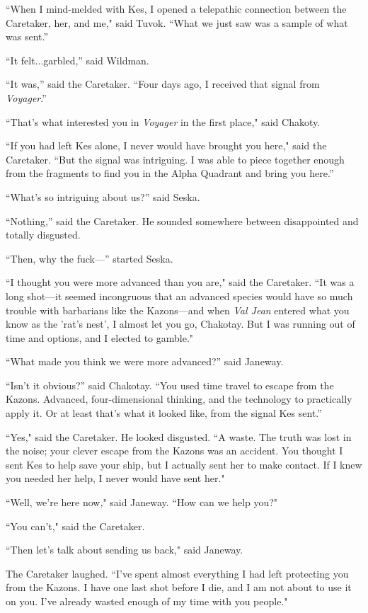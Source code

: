 \documentclass[twoside,letterpaper,12pt]{memoir}
\begin{document}
``When I mind-melded with Kes, I opened a telepathic connection between the Caretaker, her, and me," said Tuvok. ``What we just saw was a sample of what was sent.” 

``It felt...garbled,” said Wildman. 

``It was,” said the Caretaker. ``Four days ago, I received that signal from \textit{Voyager}.” 

``That's what interested you in \textit{Voyager} in the first place," said Chakoty. 

``If you had left Kes alone, I never would have brought you here," said the Caretaker. ``But the signal was intriguing. I was able to piece together enough from the fragments to find you in the Alpha Quadrant and bring you here.” 

``What’s so intriguing about us?” said Seska. 

``Nothing,” said the Caretaker. He sounded somewhere between disappointed and totally disgusted. 

``Then, why the fuck---” started Seska. 

``I thought you were more advanced than you are," said the Caretaker. ``It was a long shot---it seemed incongruous that an advanced species would have so much trouble with barbarians like the Kazons---and when \textit{Val Jean} entered what you know as the 'rat's nest', I almost let you go, Chakotay. But I was running out of time and options, and I elected to gamble." 

``What made you think we were more advanced?” said Janeway. 

``Isn’t it obvious?” said Chakotay. ``You used time travel to escape from the Kazons. Advanced, four-dimensional thinking, and the technology to practically apply it. Or at least that’s what it looked like, from the signal Kes sent.” 

``Yes," said the Caretaker. He looked disgusted. ``A waste. The truth was lost in the noise; your clever escape from the Kazons was an accident. You thought I sent Kes to help save your ship, but I actually sent her to make contact. If I knew you needed her help, I never would have sent her." 

``Well, we're here now," said Janeway. ``How can we help you?" 

``You can't," said the Caretaker. 

``Then let's talk about sending us back," said Janeway. 

The Caretaker laughed. ``I’ve spent almost everything I had left protecting you from the Kazons. I have one last shot before I die, and I am not about to use it on you. I've already wasted enough of my time with you people." 
\end{document}
